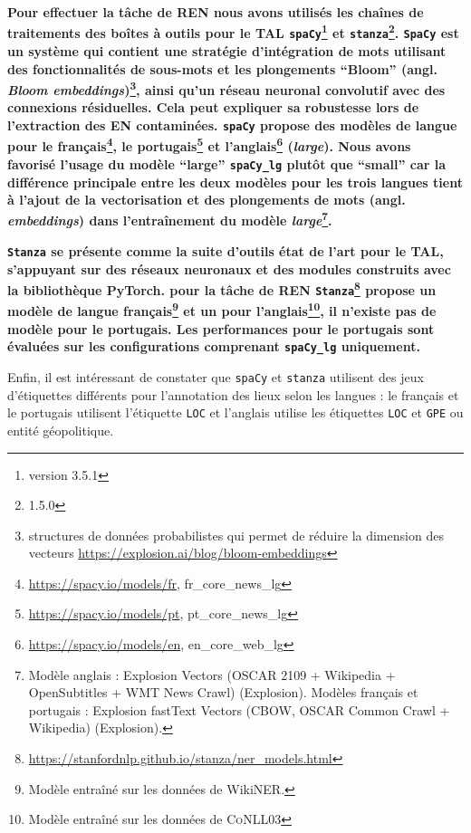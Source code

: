
\textbf{Pour effectuer la tâche de REN nous avons utilisés les chaînes de traitements des boîtes à outils pour le TAL \texttt{spaCy}\footnote{version 3.5.1} et \texttt{stanza}\footnote{1.5.0}. 
\texttt{SpaCy} est un système qui contient une stratégie d'intégration de mots utilisant des fonctionnalités de sous-mots et les plongements ``Bloom'' (angl. \textit{Bloom embeddings})\footnote{structures de données probabilistes qui permet de réduire la dimension des vecteurs \url{https://explosion.ai/blog/bloom-embeddings}}, ainsi qu'un réseau neuronal convolutif avec des connexions résiduelles. Cela peut expliquer sa robustesse lors de l'extraction des EN contaminées. \texttt{spaCy} propose des modèles de langue pour le français\footnote{\url{https://spacy.io/models/fr}, fr\_core\_news\_lg}, le portugais\footnote{\url{https://spacy.io/models/pt}, pt\_core\_news\_lg} et l'anglais\footnote{\url{https://spacy.io/models/en}, en\_core\_web\_lg} (\textit{large}). Nous avons favorisé l'usage du modèle ``large''  \texttt{spaCy\_lg} plutôt que ``small'' car la différence principale entre les deux modèles pour les trois langues tient à l'ajout de la vectorisation et des plongements de mots (angl. \textit{embeddings}) dans l'entraînement du modèle \textit{large}\footnote{Modèle anglais : Explosion Vectors (OSCAR 2109 + Wikipedia + OpenSubtitles + WMT News Crawl) (Explosion). Modèles français et portugais :
Explosion fastText Vectors (CBOW, OSCAR Common Crawl + Wikipedia) (Explosion).}.}


\textbf{\texttt{Stanza} se présente comme la suite d'outils état de l'art pour le TAL, s'appuyant sur des réseaux neuronaux et des modules construits avec la bibliothèque PyTorch. pour la tâche de REN \texttt{Stanza}\footnote{\url{https://stanfordnlp.github.io/stanza/ner_models.html}} propose un modèle de langue français\footnote{Modèle entraîné sur les données de WikiNER.} et un pour l'anglais\footnote{Modèle entraîné sur les données de \textsc{CoNLL03}}, il n'existe pas de modèle pour le portugais. 
Les performances pour le portugais sont évaluées sur les configurations comprenant \texttt{spaCy\_lg} uniquement.}

Enfin, il est intéressant de constater que \texttt{spaCy} et \texttt{stanza} utilisent des jeux d'étiquettes différents pour l'annotation des lieux selon les langues : le français et le portugais utilisent l'étiquette \texttt{LOC} et l'anglais utilise les étiquettes \texttt{LOC} et \texttt{GPE} ou \og{}entité géopolitique\fg{}. 

